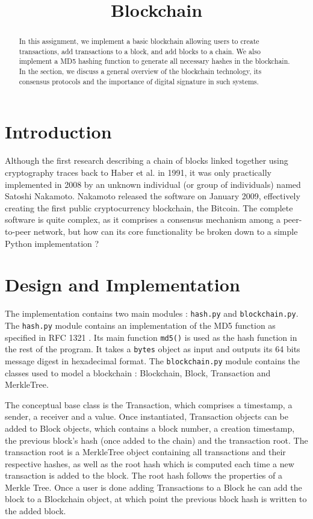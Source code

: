 \documentclass{article}
\title{\textbf{Blockchain}}
\author{}
\date{}
\begin{document}
\maketitle \thispagestyle{fancy}

\begin{abstract}
    In this assignment, we implement a basic blockchain allowing users to create transactions, add transactions to a block, and add blocks to a chain. We also implement a MD5 hashing function to generate all necessary hashes in the blockchain. In the  section, we discuss a general overview of the blockchain technology, its consensus protocols and the importance of digital signature in such systems.
\end{abstract}

\section{Introduction}

Although the first research describing a chain of blocks linked together using cryptography traces back to Haber et al.\cite{Haber1991} in 1991, it was only practically implemented in 2008 by an unknown individual (or group of individuals) named Satoshi Nakamoto\cite{nakamoto2012bitcoin}. Nakamoto released the software on January 2009, effectively creating the first public cryptocurrency blockchain, the Bitcoin. The complete software is quite complex, as it comprises a consensus mechanism among a peer-to-peer network, but how can its core functionality be broken down to a simple Python implementation ?

\section{Design and Implementation}

The implementation contains two main modules : \verb+hash.py+ and \verb+blockchain.py+. The \verb+hash.py+ module contains an implementation of the MD5 function as specified in RFC 1321 \cite{RFC1321}. Its main function \verb+md5()+ is used as the hash function in the rest of the program. It takes a \verb+bytes+ object as input and outputs its 64 bits message digest in hexadecimal format. The \verb+blockchain.py+ module contains the classes used to model a blockchain : Blockchain, Block, Transaction and MerkleTree.

\bigskip

The conceptual base class is the Transaction, which comprises a timestamp, a sender, a receiver and a value. Once instantiated, Transaction objects can be added to Block objects, which contains a block number, a creation timestamp, the previous block's hash (once added to the chain) and the transaction root. The transaction root is a MerkleTree object containing all transactions and their respective hashes, as well as the root hash which is computed each time a new transaction is added to the block. The root hash follows the properties of a Merkle Tree\cite{wiki:merkletree}. Once a user is done adding Transactions to a Block he can add the block to a Blockchain object, at which point the previous block hash is written to the added block.
\end{document}
